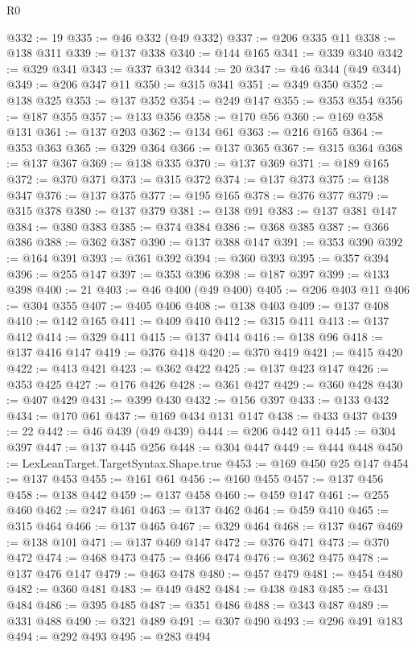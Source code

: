\begin{lexlean}{R0}
\begin{coremodule}
@332 := 19
@335 := @46 @332 (@49 @332)
@337 := @206 @335 @11
@338 := @138 @311
@339 := @137 @338
@340 := @144 @165
@341 := @339 @340
@342 := @329 @341
@343 := @337 @342
@344 := 20
@347 := @46 @344 (@49 @344)
@349 := @206 @347 @11
@350 := @315 @341
@351 := @349 @350
@352 := @138 @325
@353 := @137 @352
@354 := @249 @147
@355 := @353 @354
@356 := @187 @355
@357 := @133 @356
@358 := @170 @56
@360 := @169 @358 @131
@361 := @137 @203
@362 := @134 @61
@363 := @216 @165
@364 := @353 @363
@365 := @329 @364
@366 := @137 @365
@367 := @315 @364
@368 := @137 @367
@369 := @138 @335
@370 := @137 @369
@371 := @189 @165
@372 := @370 @371
@373 := @315 @372
@374 := @137 @373
@375 := @138 @347
@376 := @137 @375
@377 := @195 @165
@378 := @376 @377
@379 := @315 @378
@380 := @137 @379
@381 := @138 @91
@383 := @137 @381 @147
@384 := @380 @383
@385 := @374 @384
@386 := @368 @385
@387 := @366 @386
@388 := @362 @387
@390 := @137 @388 @147
@391 := @353 @390
@392 := @164 @391
@393 := @361 @392
@394 := @360 @393
@395 := @357 @394
@396 := @255 @147
@397 := @353 @396
@398 := @187 @397
@399 := @133 @398
@400 := 21
@403 := @46 @400 (@49 @400)
@405 := @206 @403 @11
@406 := @304 @355
@407 := @405 @406
@408 := @138 @403
@409 := @137 @408
@410 := @142 @165
@411 := @409 @410
@412 := @315 @411
@413 := @137 @412
@414 := @329 @411
@415 := @137 @414
@416 := @138 @96
@418 := @137 @416 @147
@419 := @376 @418
@420 := @370 @419
@421 := @415 @420
@422 := @413 @421
@423 := @362 @422
@425 := @137 @423 @147
@426 := @353 @425
@427 := @176 @426
@428 := @361 @427
@429 := @360 @428
@430 := @407 @429
@431 := @399 @430
@432 := @156 @397
@433 := @133 @432
@434 := @170 @61
@437 := @169 @434 @131 @147
@438 := @433 @437
@439 := 22
@442 := @46 @439 (@49 @439)
@444 := @206 @442 @11
@445 := @304 @397
@447 := @137 @445 @256
@448 := @304 @447
@449 := @444 @448
@450 := LexLeanTarget.TargetSyntax.Shape.true
@453 := @169 @450 @25 @147
@454 := @137 @453
@455 := @161 @61
@456 := @160 @455
@457 := @137 @456
@458 := @138 @442
@459 := @137 @458
@460 := @459 @147
@461 := @255 @460
@462 := @247 @461
@463 := @137 @462
@464 := @459 @410
@465 := @315 @464
@466 := @137 @465
@467 := @329 @464
@468 := @137 @467
@469 := @138 @101
@471 := @137 @469 @147
@472 := @376 @471
@473 := @370 @472
@474 := @468 @473
@475 := @466 @474
@476 := @362 @475
@478 := @137 @476 @147
@479 := @463 @478
@480 := @457 @479
@481 := @454 @480
@482 := @360 @481
@483 := @449 @482
@484 := @438 @483
@485 := @431 @484
@486 := @395 @485
@487 := @351 @486
@488 := @343 @487
@489 := @331 @488
@490 := @321 @489
@491 := @307 @490
@493 := @296 @491 @183
@494 := @292 @493
@495 := @283 @494

\end{coremodule}
\end{lexlean}
